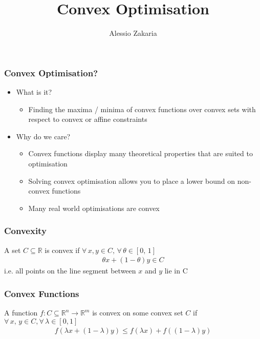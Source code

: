 \documentclass{beamer}
\title{Convex Optimisation}
\author{Alessio Zakaria}
\date{}
\def\rnum{\mathbb{R}}
\begin{document}
\begin{frame}
    \titlepage
\end{frame}

\begin{frame}
    \frametitle{Convex Optimisation?}
    \begin{itemize}
    \item What is it?
        \begin{itemize}
        \item Finding the maxima / minima of convex functions over convex sets
        with respect to convex or affine constraints
        \end{itemize}
    \item Why do we care?
        \begin{itemize}
            \item Convex functions display many theoretical properties that are
                suited to optimisation
            \item Solving convex optimisation allows you to place a lower bound
                on non-convex functions
            \item Many real world optimisations are convex
        \end{itemize}
    \end{itemize}
\end{frame}
\begin{frame}
    \frametitle{Convexity}
    A set $C \subseteq \mathbb{R}$ is convex if $\forall \,  x,  y \in C, \,
    \forall \, \theta \in [0, \, 1]$
    \begin{align*}
        \theta x + (1-\theta)y \in C
    \end{align*}
    i.e. all points on the line segment between $x$ and $y$ lie in C
\end{frame}

\begin{frame}
    \frametitle{Convex Functions}
    A function $f : C \subseteq \mathbb{R}^{n} \rightarrow \rnum^{m}$ is convex
    on some convex set $C$ if $\forall \, x, \, y \in C, \forall \, \lambda \in
    [0,1]$
    \begin{align*}
        f(\lambda x + (1 - \lambda)y) \leq f(\lambda x) + f((1-\lambda)y)
    \end{align*}
\end{frame}
\end{document}
